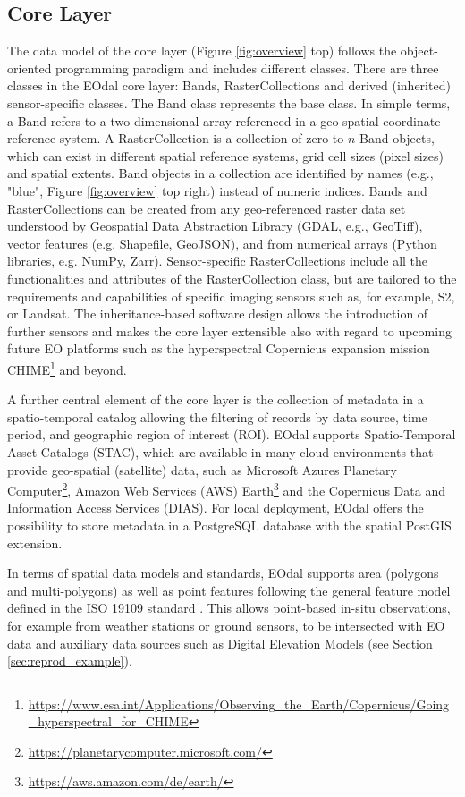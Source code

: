 \subsection{Core Layer}
The data model of the core layer (Figure \ref{fig:overview} top) follows the object-oriented programming paradigm and includes different classes. There are three classes in the EOdal core layer: Bands, RasterCollections and derived (inherited) sensor-specific classes. The Band class represents the base class. In simple terms, a Band refers to a two-dimensional array referenced in a geo-spatial coordinate reference system. A RasterCollection is a collection of zero to $n$ Band objects, which can exist in different spatial reference systems, grid cell sizes (pixel sizes) and spatial extents. Band objects in a collection are identified by names (e.g., "blue", Figure \ref{fig:overview} top right) instead of numeric indices. Bands and RasterCollections can be created from any geo-referenced raster data set understood by Geospatial Data Abstraction Library (GDAL, e.g., GeoTiff), vector features (e.g. Shapefile, GeoJSON), and from numerical arrays (Python libraries, e.g. NumPy, Zarr). Sensor-specific RasterCollections include all the functionalities and attributes of the RasterCollection class, but are tailored to the requirements and capabilities of specific imaging sensors such as, for example, S2, or Landsat. The inheritance-based software design allows the introduction of further sensors and makes the core layer extensible also with regard to upcoming future EO platforms such as the hyperspectral Copernicus expansion mission CHIME\footnote{\url{https://www.esa.int/Applications/Observing_the_Earth/Copernicus/Going_hyperspectral_for_CHIME}} and beyond.

A further central element of the core layer is the collection of metadata in a spatio-temporal catalog  allowing the filtering of records by data source, time period, and geographic region of interest (ROI). EOdal supports Spatio-Temporal Asset Catalogs (STAC), which are available in many cloud environments that provide geo-spatial (satellite) data, such as Microsoft Azures Planetary Computer\footnote{\url{https://planetarycomputer.microsoft.com/}}, Amazon Web Services (AWS) Earth\footnote{\url{https://aws.amazon.com/de/earth/}} and the Copernicus Data and Information Access Services (DIAS). For local deployment, EOdal offers the possibility to store metadata in a PostgreSQL database with the spatial PostGIS extension.

In terms of spatial data models and standards, EOdal supports area (polygons and multi-polygons) as well as point features following the general feature model defined in the ISO 19109 standard \citep{iso_iso_2015}. This allows point-based in-situ observations, for example from weather stations or ground sensors, to be intersected with EO data and auxiliary data sources such as Digital Elevation Models (see Section \ref{sec:reprod_example}).

